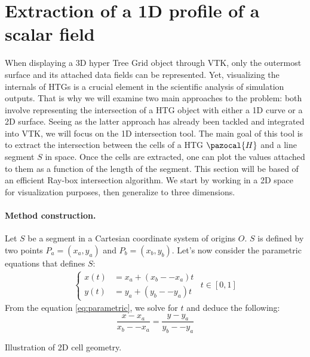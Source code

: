 \documentclass[
	a4paper,
	12pt,
	raggedright,
	twoside
]{tufte-style-article}
\theoremstyle{definition}
\theoremstyle{remark}
\begin{document}
\section{Extraction of a 1D profile of a scalar field}\label{sec:1d_profile}
When displaying a 3D hyper Tree Grid object through \Gls{VTK}, only the outermost surface and its attached data fields can be represented. Yet, visualizing the internals of \Gls{HTG}s is a crucial element in the scientific analysis of simulation outputs. That is why we will examine two main approaches to the problem: both involve representing the intersection of a \Gls{HTG} object with either a 1D curve or a 2D surface. Seeing as the latter approach has already been tackled and integrated into \Gls{VTK}, \cite{HTG_dam} we will focus on the 1D intersection tool. The main goal of this tool is to extract the intersection between the cells of a \Gls{HTG} $\pazocal{H}$ and a line segment $S$ in space. Once the cells are extracted, one can plot the values attached to them as a function of the length of the segment.
This section will be based of an efficient Ray-box intersection algorithm.\cite{ray_casting} We start by working in a 2D space for visualization purposes, then generalize to three dimensions.
\paragraph{Method construction.} Let $S$ be a segment in a Cartesian coordinate system of origins $O$. $S$ is defined by two points $P_a = (x_a, y_a)$ and $P_b = (x_b, y_b)$. Let's now consider the parametric equations that defines $S$:
\begin{align}\label{eq:parametric}
\begin{cases}
x(t) &= x_a + (x_b -- x_a)t \\
y(t) &= y_a + (y_b -- y_a)t
\end{cases}
\hspace{5pt} t \in [0, 1]
\end{align}
From the equation \ref{eq:parametric}, we solve for $t$ and deduce the following:
\begin{equation}\label{eq:para_eq}
    \frac{x-x_a}{x_b -- x_a} = \frac{y-y_a}{y_b -- y_a}
\end{equation}

\begin{marginfigure}
    \centering
    
    \caption{Illustration of 2D cell geometry. \label{fig:cell_intersect}}
\end{marginfigure}
\end{document}
